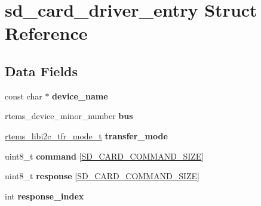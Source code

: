 \hypertarget{structsd__card__driver__entry}{}\section{sd\+\_\+card\+\_\+driver\+\_\+entry Struct Reference}
\label{structsd__card__driver__entry}
\subsection*{Data Fields}
\begin{DoxyCompactItemize}
\item 
\mbox{\label{structsd__card__driver__entry_aa18127f8b7ffb4981c725dfd9e939be9}} 
const char $\ast$ {\bfseries device\+\_\+name}
\item 
\mbox{\label{structsd__card__driver__entry_aa54507c79f5f1362500e7f875dba8cef}} 
rtems\+\_\+device\+\_\+minor\+\_\+number {\bfseries bus}
\item 
\mbox{\label{structsd__card__driver__entry_a33b55a74def3e5a698798a466fc205d2}} 
\mbox{\hyperlink{structrtems__libi2c__tfr__mode__t}{rtems\+\_\+libi2c\+\_\+tfr\+\_\+mode\+\_\+t}} {\bfseries transfer\+\_\+mode}
\item 
\mbox{\label{structsd__card__driver__entry_a5a5dddf7c2a64b5c56a6b8b18db564eb}} 
uint8\+\_\+t {\bfseries command} \mbox{[}\mbox{\hyperlink{spi-sd-card_8h_add81282988892598d653b96979fb8991}{S\+D\+\_\+\+C\+A\+R\+D\+\_\+\+C\+O\+M\+M\+A\+N\+D\+\_\+\+S\+I\+ZE}}\mbox{]}
\item 
\mbox{\label{structsd__card__driver__entry_a1933a7108f63642d7fc806990e62ab40}} 
uint8\+\_\+t {\bfseries response} \mbox{[}\mbox{\hyperlink{spi-sd-card_8h_add81282988892598d653b96979fb8991}{S\+D\+\_\+\+C\+A\+R\+D\+\_\+\+C\+O\+M\+M\+A\+N\+D\+\_\+\+S\+I\+ZE}}\mbox{]}
\item 
\mbox{\label{structsd__card__driver__entry_a4048885f2d6ae332f31c87633d4e73cf}} 
int {\bfseries response\+\_\+index}
\item 
\mbox{\label{structsd__card__driver__entry_aecb322f66f2771fb162fcc32de53acde}} 

\end{DoxyCompactItemize}
